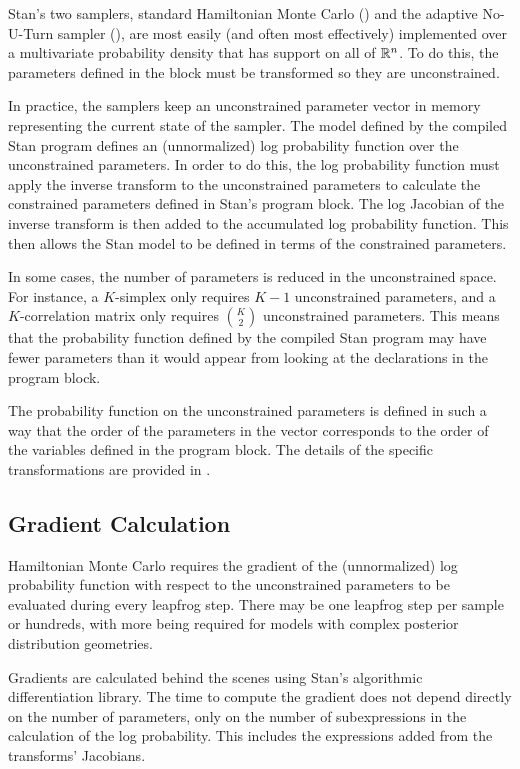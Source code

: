 Stan's two samplers, standard Hamiltonian Monte Carlo (\HMC) and the
adaptive No-U-Turn sampler (\NUTS), are most easily (and often most
effectively) implemented over a multivariate probability density that
has support on all of $\reals^n$.  To do this, the parameters
defined in the  block must be transformed so they are
unconstrained.

In practice, the samplers keep an unconstrained parameter vector in
memory representing the current state of the sampler.  The model
defined by the compiled Stan program defines an (unnormalized) log
probability function over the unconstrained parameters.  In order to
do this, the log probability function must apply the inverse transform
to the unconstrained parameters to calculate the constrained
parameters defined in Stan's  program block.  The
log Jacobian of the inverse transform is then added to the accumulated
log probability function.  This then allows the Stan model to be
defined in terms of the constrained parameters.

In some cases, the number of parameters is reduced in the
unconstrained space.  For instance, a $K$-simplex only requires $K-1$
unconstrained parameters, and a $K$-correlation matrix only requires
$\binom{K}{2}$ unconstrained parameters.  This means that the
probability function defined by the compiled Stan program may have
fewer parameters than it would appear from looking at the declarations
in the  program block.

The probability function on the unconstrained parameters is defined in
such a way that the order of the parameters in the vector corresponds
to the order of the variables defined in the  program
block.  The details of the specific transformations are provided in
.

\subsection{Gradient Calculation}

Hamiltonian Monte Carlo requires the gradient of the (unnormalized)
log probability function with respect to the unconstrained parameters
to be evaluated during every leapfrog step.  There may be one leapfrog
step per sample or hundreds, with more being required for models with
complex posterior distribution geometries.

Gradients are calculated behind the scenes using Stan's algorithmic
differentiation library.  The time to compute the gradient does not
depend directly on the number of parameters, only on the number of
subexpressions in the calculation of the log probability.  This
includes the expressions added from the transforms' Jacobians.

